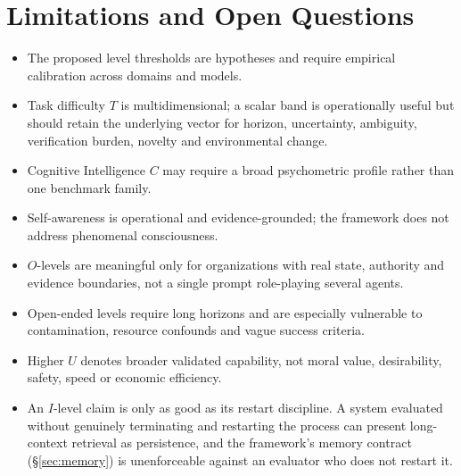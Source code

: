 \documentclass[11pt]{article}
\theoremstyle{definition}
\begin{document}
\section{Limitations and Open Questions}

\begin{itemize}
\item The proposed level thresholds are hypotheses and require empirical calibration across domains and models.
\item Task difficulty $T$ is multidimensional; a scalar band is operationally useful but should retain the underlying vector for horizon, uncertainty, ambiguity, verification burden, novelty and environmental change.
\item Cognitive Intelligence $C$ may require a broad psychometric profile rather than one benchmark family.
\item Self-awareness is operational and evidence-grounded; the framework does not address phenomenal consciousness.
\item $O$-levels are meaningful only for organizations with real state, authority and evidence boundaries, not a single prompt role-playing several agents.
\item Open-ended levels require long horizons and are especially vulnerable to contamination, resource confounds and vague success criteria.
\item Higher $U$ denotes broader validated capability, not moral value, desirability, safety, speed or economic efficiency.
\item An $I$-level claim is only as good as its restart discipline. A system evaluated without genuinely terminating and restarting the process can present long-context retrieval as persistence, and the framework's memory contract (\S\ref{sec:memory}) is unenforceable against an evaluator who does not restart it.
\end{itemize}
\end{document}
